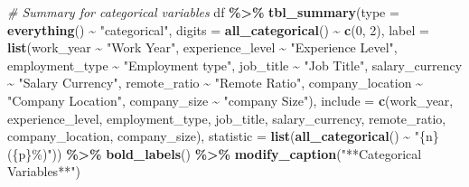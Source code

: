 \documentclass[
]{article}
\newenvironment{Shaded}{\begin{snugshade}}{\end{snugshade}}
\newcommand{\AttributeTok}[1]{\textcolor[rgb]{0.13,0.29,0.53}{#1}}
\newcommand{\CommentTok}[1]{\textcolor[rgb]{0.56,0.35,0.01}{\textit{#1}}}
\newcommand{\DecValTok}[1]{\textcolor[rgb]{0.00,0.00,0.81}{#1}}
\newcommand{\FunctionTok}[1]{\textcolor[rgb]{0.13,0.29,0.53}{\textbf{#1}}}
\newcommand{\NormalTok}[1]{#1}
\newcommand{\SpecialCharTok}[1]{\textcolor[rgb]{0.81,0.36,0.00}{\textbf{#1}}}
\newcommand{\StringTok}[1]{\textcolor[rgb]{0.31,0.60,0.02}{#1}}
\begin{document}
\begin{Shaded}
\begin{Highlighting}[]
\CommentTok{\# Summary for categorical variables }
\NormalTok{df }\SpecialCharTok{\%\textgreater{}\%}
  \FunctionTok{tbl\_summary}\NormalTok{(}\AttributeTok{type =} \FunctionTok{everything}\NormalTok{() }\SpecialCharTok{\textasciitilde{}} \StringTok{"categorical"}\NormalTok{, }
              \AttributeTok{digits =} \FunctionTok{all\_categorical}\NormalTok{() }\SpecialCharTok{\textasciitilde{}} \FunctionTok{c}\NormalTok{(}\DecValTok{0}\NormalTok{, }\DecValTok{2}\NormalTok{), }
              \AttributeTok{label =} \FunctionTok{list}\NormalTok{(work\_year }\SpecialCharTok{\textasciitilde{}} \StringTok{"Work Year"}\NormalTok{, }
\NormalTok{                           experience\_level }\SpecialCharTok{\textasciitilde{}} \StringTok{"Experience Level"}\NormalTok{,}
\NormalTok{                           employment\_type }\SpecialCharTok{\textasciitilde{}} \StringTok{"Employment type"}\NormalTok{,}
\NormalTok{                           job\_title }\SpecialCharTok{\textasciitilde{}} \StringTok{"Job Title"}\NormalTok{, }
\NormalTok{                           salary\_currency }\SpecialCharTok{\textasciitilde{}} \StringTok{"Salary Currency"}\NormalTok{,}
\NormalTok{                           remote\_ratio }\SpecialCharTok{\textasciitilde{}} \StringTok{"Remote Ratio"}\NormalTok{,}
\NormalTok{                           company\_location }\SpecialCharTok{\textasciitilde{}} \StringTok{"Company Location"}\NormalTok{,}
\NormalTok{                           company\_size }\SpecialCharTok{\textasciitilde{}} \StringTok{"company Size"}\NormalTok{),}
              \AttributeTok{include =} \FunctionTok{c}\NormalTok{(work\_year, experience\_level, employment\_type, job\_title,}
\NormalTok{                          salary\_currency, remote\_ratio,}
\NormalTok{                           company\_location, company\_size),}
              \AttributeTok{statistic =} \FunctionTok{list}\NormalTok{(}\FunctionTok{all\_categorical}\NormalTok{() }\SpecialCharTok{\textasciitilde{}} \StringTok{"\{n\} (\{p\}\%)"}\NormalTok{)) }\SpecialCharTok{\%\textgreater{}\%}
  \FunctionTok{bold\_labels}\NormalTok{() }\SpecialCharTok{\%\textgreater{}\%}
  \FunctionTok{modify\_caption}\NormalTok{(}\StringTok{"**Categorical Variables**"}\NormalTok{)}
\end{Highlighting}
\end{Shaded}
\end{document}
